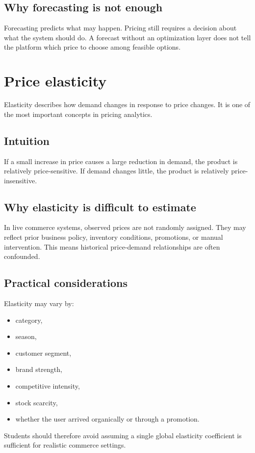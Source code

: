 \subsection{Why forecasting is not enough}
Forecasting predicts what may happen.
Pricing still requires a decision about what the system should do.
A forecast without an optimization layer does not tell the platform which price to choose among feasible options.

\section{Price elasticity}
Elasticity describes how demand changes in response to price changes.
It is one of the most important concepts in pricing analytics.

\subsection{Intuition}
If a small increase in price causes a large reduction in demand, the product is relatively price-sensitive.
If demand changes little, the product is relatively price-insensitive.

\subsection{Why elasticity is difficult to estimate}
In live commerce systems, observed prices are not randomly assigned.
They may reflect prior business policy, inventory conditions, promotions, or manual intervention.
This means historical price-demand relationships are often confounded.

\subsection{Practical considerations}
Elasticity may vary by:
\begin{itemize}
  \item category,
  \item season,
  \item customer segment,
  \item brand strength,
  \item competitive intensity,
  \item stock scarcity,
  \item whether the user arrived organically or through a promotion.
\end{itemize}

Students should therefore avoid assuming a single global elasticity coefficient is sufficient for realistic commerce settings.

